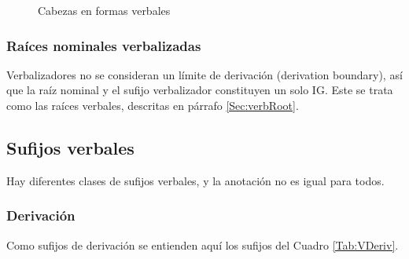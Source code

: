\documentclass[a4paper,11pt,DIV12]{scrartcl}
\begin{document}
\begin{figure}
\begin{center}
\caption{Cabezas en formas verbales}\label{Fig:VRoot}
\end{center}
\end{figure}

  \subsubsection{Ra\'ices nominales verbalizadas}
   Verbalizadores no se consideran un l\'imite de derivaci\'on (derivation boundary), as\'i que la ra\'iz nominal y el sufijo verbalizador constituyen un solo IG. Este se trata como las ra\'ices verbales, descritas en p\'arrafo \ref{Sec:verbRoot}.
  \subsection{Sufijos verbales}
  Hay diferentes clases de sufijos verbales, y la anotaci\'on no es igual para todos.
  \subsubsection{Derivaci\'on}
    Como sufijos de derivaci\'on se entienden aqu\'i los sufijos del Cuadro \ref{Tab:VDeriv}.
\end{document}
